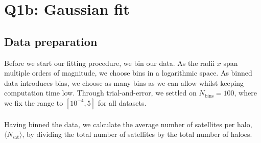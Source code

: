 \section{Q1b: Gaussian fit}
\subsection{Data preparation}
Before we start our fitting procedure, we bin our data. As the radii $x$ span multiple orders of magnitude, we choose bins in a logarithmic space. As binned data introduces bias, we choose as many bins as we can allow whilst keeping computation time low. Through trial-and-error, we settled on $N_\text{bins} = 100$, where we fix the range to $[10^{-4}, 5]$ for all datasets.\\
\\
Having binned the data, we calculate the average number of satellites per halo, $\langle N_\text{sat}\rangle$, by dividing the total number of satellites by the total number of haloes. 

